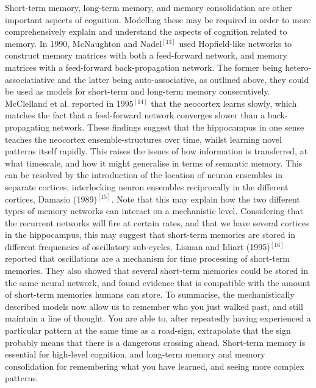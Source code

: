 Short-term memory, long-term memory, and memory consolidation are other important aspects of cognition. Modelling these may be required in order to more comprehensively explain and understand the aspects of cognition related to memory. In 1990, McNaughton and Nadel$^{[13]}$ used Hopfield-like networks to construct memory matrices with both a feed-forward network, and memory matrices with a feed-forward back-propagation network. The former being hetero-associatiative and the latter being auto-associative, as outlined above, they could be used as models for short-term and long-term memory consecutively. McClelland et al. reported in 1995$^{[14]}$ that the neocortex learns slowly, which matches the fact that a feed-forward network converges slower than a back-propagating network. These findings suggest that the hippocampus in one sense teaches the neocortex ensemble-structures over time, whilst learning novel patterns itself rapidly. This raises the issues of how information is transferred, at what timescale, and how it might generalise in terms of semantic memory. This can be resolved by the introduction of the location of neuron ensembles in separate cortices, interlocking neuron ensembles reciprocally in the different cortices, Damasio (1989)$^{[15]}$. Note that this may explain how the two different types of memory networks can interact on a mechanistic level. Considering that the recurrent networks will fire at certain rates, and that we have several cortices in the hippocampus, this may suggest that short-term memories are stored in different frequencies of oscillatory sub-cycles. Lisman and Idiart (1995)$^{[16]}$ reported that oscillations are a mechanism for time processing of short-term memories. They also showed that several short-term memories could be stored in the same neural network, and found evidence that is compatible with the amount of short-term memories humans can store. To summarise, the mechanistically described models now allow us to remember who you just walked past, and still maintain a line of thought. You are able to, after repeatedly having experienced a particular pattern at the same time as a road-sign, extrapolate that the sign probably means that there is a dangerous crossing ahead. Short-term memory is essential for high-level cognition, and long-term memory and memory consolidation for remembering what you have learned, and seeing more complex patterns. 
